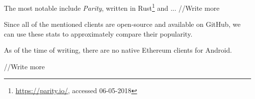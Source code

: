 The most notable include \textit{Parity}, written in Rust\footnote{\url{https://parity.io/}, accessed 06-05-2018} and ... //Write more
 
 Since all of the mentioned clients are open-source and available on GitHub, we can use these stats to approximately compare their popularity.

As of the time of writing, there are no native Ethereum clients for Android.

//Write more